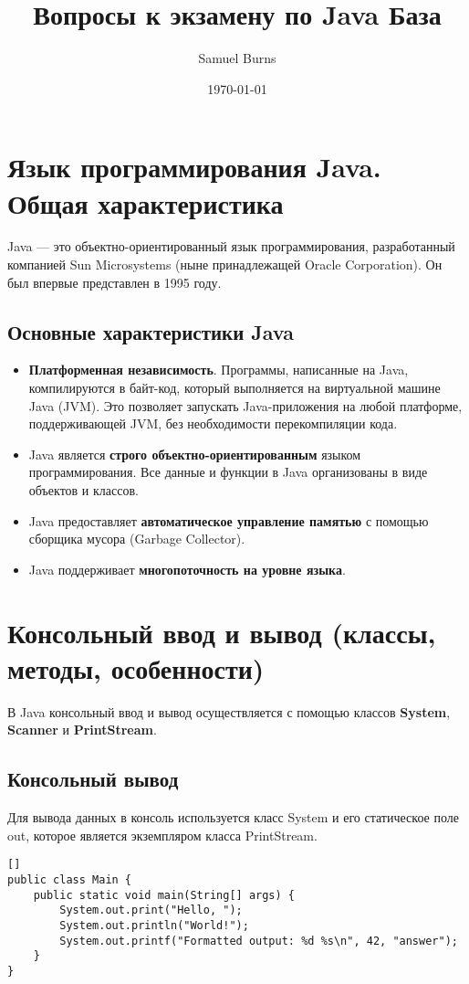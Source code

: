 \documentclass[12pt, a4paper]{article}
\title{Вопросы к экзамену по Java База}
\author{Samuel Burns}
\date{\today}
\begin{document}
\maketitle

\section{Язык программирования Java. Общая характеристика}
Java — это объектно-ориентированный язык программирования, разработанный компанией Sun Microsystems (ныне принадлежащей Oracle Corporation). Он был впервые представлен в 1995 году.
\subsection*{Основные характеристики Java}
\begin{itemize}
    \item \textbf{Платформенная независимость}. Программы, написанные на Java, компилируются в байт-код, который выполняется на виртуальной машине Java (JVM). Это позволяет запускать Java-приложения на любой платформе, поддерживающей JVM, без необходимости перекомпиляции кода.
    \item Java является \textbf{строго объектно-ориентированным} языком программирования. Все данные и функции в Java организованы в виде объектов и классов. 
    \item Java предоставляет \textbf{автоматическое управление памятью }с помощью сборщика мусора (Garbage Collector). 
    \item Java поддерживает\textbf{ многопоточность на уровне языка}.
\end{itemize}


\section{Консольный ввод и вывод (классы, методы, особенности)}
В Java консольный ввод и вывод осуществляется с помощью классов \textbf{System}, \textbf{Scanner} и \textbf{PrintStream}. 

\subsection*{Консольный вывод}
Для вывода данных в консоль используется класс System и его статическое поле out, которое является экземпляром класса PrintStream.
\begin{verbatim}[]
public class Main {
    public static void main(String[] args) {
        System.out.print("Hello, ");
        System.out.println("World!");
        System.out.printf("Formatted output: %d %s\n", 42, "answer");
    }
}
\end{verbatim}
\end{document}
